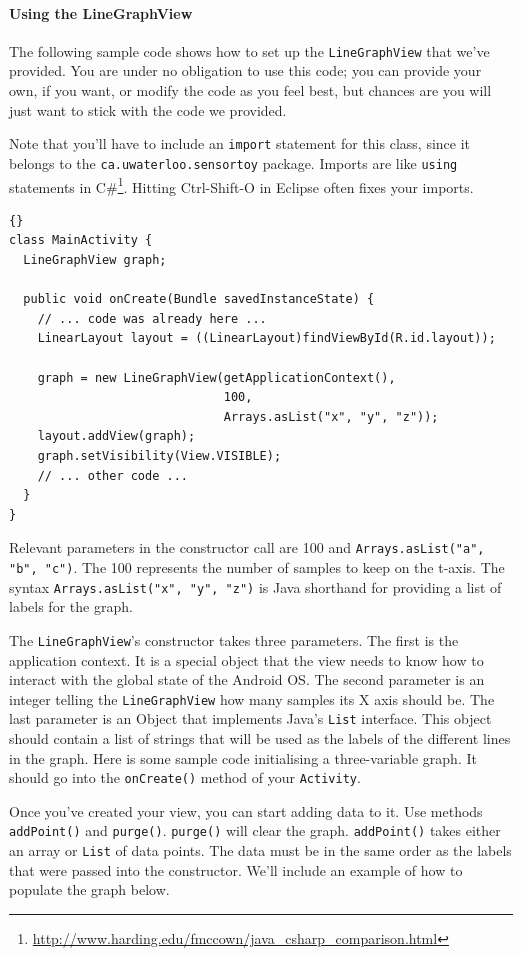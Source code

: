 \documentclass[10pt]{article}
\begin{document}
\paragraph{Using the LineGraphView}
The following sample code shows how to set up the
{\tt LineGraphView} that we've provided. You are under
no obligation to use this code; you can provide your own,
if you want, or modify the code as you feel best, but chances are you
will just want to stick with the code we provided.

Note that you'll have to include an {\tt import} statement for this
class, since it belongs to the {\tt ca.uwaterloo.sensortoy}
package. Imports are like {\tt using} statements in C\#\footnote{\url{http://www.harding.edu/fmccown/java_csharp_comparison.html}}. Hitting Ctrl-Shift-O in Eclipse often fixes your imports.
\begin{lstlisting}{}
class MainActivity {
  LineGraphView graph;

  public void onCreate(Bundle savedInstanceState) {
    // ... code was already here ...
    LinearLayout layout = ((LinearLayout)findViewById(R.id.layout));
	
    graph = new LineGraphView(getApplicationContext(), 
                              100, 
                              Arrays.asList("x", "y", "z"));
    layout.addView(graph);
    graph.setVisibility(View.VISIBLE);
    // ... other code ...
  }
}
\end{lstlisting}
Relevant parameters in the
constructor call are 100 and \verb+Arrays.asList("a", "b", "c")+. The 100 represents the number of samples to keep on the
t-axis. The syntax {\tt Arrays.asList("x", "y", "z")} is Java
shorthand for providing a list of labels for the graph.

The {\tt LineGraphView}'s constructor takes three parameters. The first is the application context. It is a special object that the view needs to know how to interact with the global state of the Android OS. The second parameter is an integer telling the {\tt LineGraphView} how many samples its X axis should be. The last parameter is an Object that implements Java's {\tt List} interface. This object should contain a list of strings that will be used as the labels of the different lines in the graph. Here is some sample code initialising a three-variable graph. It should go into the {\tt onCreate()} method of your {\tt Activity}.

Once you've created your view, you can start adding data to it. Use methods {\tt addPoint()} and {\tt purge()}. {\tt purge()} will clear the graph. {\tt addPoint()} takes either an array or {\tt List} of data points. The data must be in the same order as the labels that were passed into the constructor. We'll include an example of how to populate the graph below.
\end{document}
